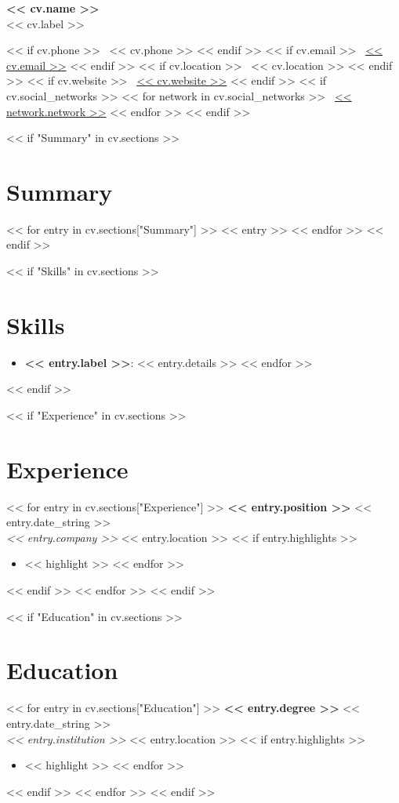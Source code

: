 \documentclass[10pt, letterpaper]{article}
\newcommand{\cvheader}[2]{
    \begin{center}
        {\Huge \bfseries #1} \\ \vspace{0.2em}
        {\large #2} \\ \vspace{0.2em}
    \end{center}
}
\begin{document}
\cvheader{<< cv.name >>}{<< cv.label >>}

\begin{center}
    << if cv.phone >>
    \faPhone \ << cv.phone >> \quad
    << endif >>
    << if cv.email >>
    \faEnvelope \ \href{mailto:<< cv.email >>}{<< cv.email >>} \quad
    << endif >>
    << if cv.location >>
    \faMapMarker \ << cv.location >> \quad
    << endif >>
    << if cv.website >>
    \faGlobe \ \href{<< cv.website >>}{<< cv.website >>} \quad
    << endif >>
    << if cv.social_networks >>
    << for network in cv.social_networks >>
    \faLink \ \href{<< network.url >>}{<< network.network >>} \quad
    << endfor >>
    << endif >>
\end{center}

\vspace{0.5em}

<< if "Summary" in cv.sections >>
\section*{Summary}
<< for entry in cv.sections["Summary"] >>
<< entry >>
<< endfor >>
<< endif >>

<< if "Skills" in cv.sections >>
\section*{Skills}
\begin{itemize}
    << for entry in cv.sections["Skills"] >>
    \item \textbf{<< entry.label >>}: << entry.details >>
    << endfor >>
\end{itemize}
<< endif >>

<< if "Experience" in cv.sections >>
\section*{Experience}
<< for entry in cv.sections["Experience"] >>
\noindent\textbf{<< entry.position >>} \hfill << entry.date_string >> \\
\textit{<< entry.company >>} \hfill << entry.location >>
<< if entry.highlights >>
\begin{itemize}
    << for highlight in entry.highlights >>
    \item << highlight >>
    << endfor >>
\end{itemize}
<< endif >>
\vspace{0.5em}
<< endfor >>
<< endif >>

<< if "Education" in cv.sections >>
\section*{Education}
<< for entry in cv.sections["Education"] >>
\noindent\textbf{<< entry.degree >>} \hfill << entry.date_string >> \\
\textit{<< entry.institution >>} \hfill << entry.location >>
<< if entry.highlights >>
\begin{itemize}
    << for highlight in entry.highlights >>
    \item << highlight >>
    << endfor >>
\end{itemize}
<< endif >>
\vspace{0.5em}
<< endfor >>
<< endif >>
\end{document}
